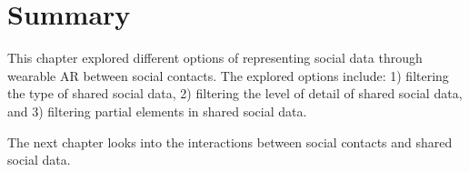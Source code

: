 \section{Summary}

This chapter explored different options of representing social data through wearable AR between social contacts. The explored options include: 1) filtering the type of shared social data, 2) filtering the level of detail of shared social data, and 3) filtering partial elements in shared social data. 

The next chapter looks into the interactions between social contacts and shared social data. 